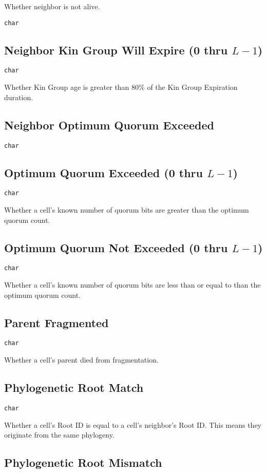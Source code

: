 Whether neighbor is not alive.

\texttt{char}

\subsection{Neighbor Kin Group Will Expire (0 thru $L-1$)}

\texttt{char}

Whether Kin Group age is greater than 80\% of the Kin Group Expiration duration.

\subsection{Neighbor Optimum Quorum Exceeded}

\texttt{char}

\subsection{Optimum Quorum Exceeded (0 thru $L-1$)}

\texttt{char}

Whether a cell's known number of quorum bits are greater than the optimum quorum count.

\subsection{Optimum Quorum Not Exceeded (0 thru $L-1$)}

\texttt{char}

Whether a cell's known number of quorum bits are less than or equal to than the optimum quorum count.

\subsection{Parent Fragmented}

\texttt{char}

Whether a cell's parent died from fragmentation.

\subsection{Phylogenetic Root Match}

\texttt{char}

Whether a cell's Root ID is equal to a cell's neighbor's Root ID. This means they originate from the same phylogeny.

\subsection{Phylogenetic Root Mismatch}

